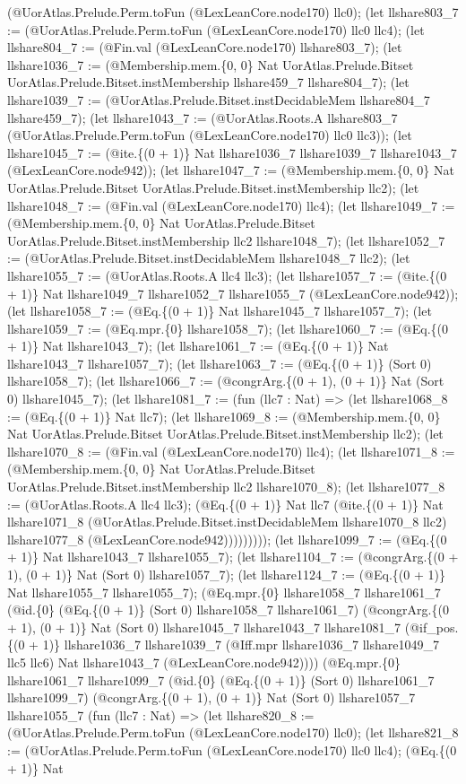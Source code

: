 \documentclass[11pt]{article}
\begin{document}
(@UorAtlas.Prelude.Perm.toFun (@LexLeanCore.node170) llc0); (let llshare803\_7 := (@UorAtlas.Prelude.Perm.toFun (@LexLeanCore.node170) llc0 llc4); (let llshare804\_7 := (@Fin.val (@LexLeanCore.node170) llshare803\_7); (let llshare1036\_7 := (@Membership.mem.\{0, 0\} Nat UorAtlas.Prelude.Bitset UorAtlas.Prelude.Bitset.instMembership llshare459\_7 llshare804\_7); (let llshare1039\_7 := (@UorAtlas.Prelude.Bitset.instDecidableMem llshare804\_7 llshare459\_7); (let llshare1043\_7 := (@UorAtlas.Roots.A llshare803\_7 (@UorAtlas.Prelude.Perm.toFun (@LexLeanCore.node170) llc0 llc3)); (let llshare1045\_7 := (@ite.\{(0 + 1)\} Nat llshare1036\_7 llshare1039\_7 llshare1043\_7 (@LexLeanCore.node942)); (let llshare1047\_7 := (@Membership.mem.\{0, 0\} Nat UorAtlas.Prelude.Bitset UorAtlas.Prelude.Bitset.instMembership llc2); (let llshare1048\_7 := (@Fin.val (@LexLeanCore.node170) llc4); (let llshare1049\_7 := (@Membership.mem.\{0, 0\} Nat UorAtlas.Prelude.Bitset UorAtlas.Prelude.Bitset.instMembership llc2 llshare1048\_7); (let llshare1052\_7 := (@UorAtlas.Prelude.Bitset.instDecidableMem llshare1048\_7 llc2); (let llshare1055\_7 := (@UorAtlas.Roots.A llc4 llc3); (let llshare1057\_7 := (@ite.\{(0 + 1)\} Nat llshare1049\_7 llshare1052\_7 llshare1055\_7 (@LexLeanCore.node942)); (let llshare1058\_7 := (@Eq.\{(0 + 1)\} Nat llshare1045\_7 llshare1057\_7); (let llshare1059\_7 := (@Eq.mpr.\{0\} llshare1058\_7); (let llshare1060\_7 := (@Eq.\{(0 + 1)\} Nat llshare1043\_7); (let llshare1061\_7 := (@Eq.\{(0 + 1)\} Nat llshare1043\_7 llshare1057\_7); (let llshare1063\_7 := (@Eq.\{(0 + 1)\} (Sort 0) llshare1058\_7); (let llshare1066\_7 := (@congrArg.\{(0 + 1), (0 + 1)\} Nat (Sort 0) llshare1045\_7); (let llshare1081\_7 := (fun (llc7 : Nat) => (let llshare1068\_8 := (@Eq.\{(0 + 1)\} Nat llc7); (let llshare1069\_8 := (@Membership.mem.\{0, 0\} Nat UorAtlas.Prelude.Bitset UorAtlas.Prelude.Bitset.instMembership llc2); (let llshare1070\_8 := (@Fin.val (@LexLeanCore.node170) llc4); (let llshare1071\_8 := (@Membership.mem.\{0, 0\} Nat UorAtlas.Prelude.Bitset UorAtlas.Prelude.Bitset.instMembership llc2 llshare1070\_8); (let llshare1077\_8 := (@UorAtlas.Roots.A llc4 llc3); (@Eq.\{(0 + 1)\} Nat llc7 (@ite.\{(0 + 1)\} Nat llshare1071\_8 (@UorAtlas.Prelude.Bitset.instDecidableMem llshare1070\_8 llc2) llshare1077\_8 (@LexLeanCore.node942))))))))); (let llshare1099\_7 := (@Eq.\{(0 + 1)\} Nat llshare1043\_7 llshare1055\_7); (let llshare1104\_7 := (@congrArg.\{(0 + 1), (0 + 1)\} Nat (Sort 0) llshare1057\_7); (let llshare1124\_7 := (@Eq.\{(0 + 1)\} Nat llshare1055\_7 llshare1055\_7); (@Eq.mpr.\{0\} llshare1058\_7 llshare1061\_7 (@id.\{0\} (@Eq.\{(0 + 1)\} (Sort 0) llshare1058\_7 llshare1061\_7) (@congrArg.\{(0 + 1), (0 + 1)\} Nat (Sort 0) llshare1045\_7 llshare1043\_7 llshare1081\_7 (@if\_pos.\{(0 + 1)\} llshare1036\_7 llshare1039\_7 (@Iff.mpr llshare1036\_7 llshare1049\_7 llc5 llc6) Nat llshare1043\_7 (@LexLeanCore.node942)))) (@Eq.mpr.\{0\} llshare1061\_7 llshare1099\_7 (@id.\{0\} (@Eq.\{(0 + 1)\} (Sort 0) llshare1061\_7 llshare1099\_7) (@congrArg.\{(0 + 1), (0 + 1)\} Nat (Sort 0) llshare1057\_7 llshare1055\_7 (fun (llc7 : Nat) => (let llshare820\_8 := (@UorAtlas.Prelude.Perm.toFun (@LexLeanCore.node170) llc0); (let llshare821\_8 := (@UorAtlas.Prelude.Perm.toFun (@LexLeanCore.node170) llc0 llc4); (@Eq.\{(0 + 1)\} Nat 
\end{document}
